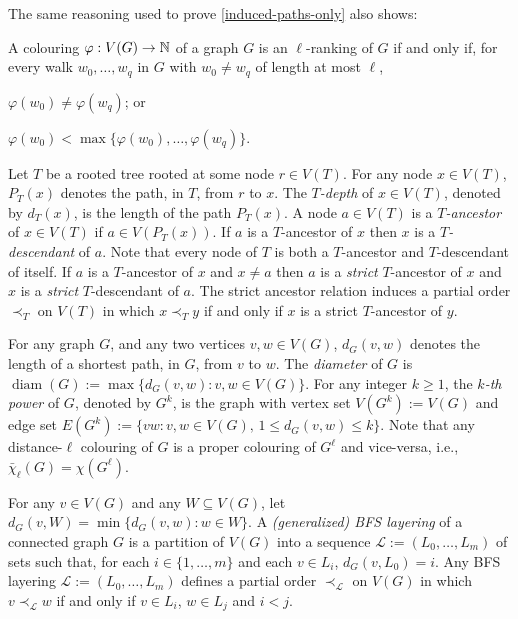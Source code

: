\documentclass[kpfonts]{patmorin}
\DeclareMathOperator{\diam}{diam}
\newcommand{\dlcn}{\bar{\chi}_\ell}
\theoremstyle{named}
\begin{document}
The same reasoning used to prove \cref{induced-paths-only} also shows:

\begin{obs}\label{walks-too}
    A colouring $\varphi:V(G)\to\mathbb{N}$ of a graph $G$ is an $\ell$-ranking of $G$ if and only if, for every walk $w_0,\ldots,w_q$ in $G$ with $w_0\neq w_q$ of length at most $\ell$,
    \begin{inparaenum}[(i)]
        \item $\varphi(w_0)\neq\varphi(w_q)$; or
        \item $\varphi(w_0)<\max\{\varphi(w_0),\ldots,\varphi(w_q)\}$.
    \end{inparaenum}
\end{obs}


Let $T$ be a rooted tree rooted at some node $r\in V(T)$.  For any node $x\in V(T)$, $P_T(x)$ denotes the path, in $T$, from $r$ to $x$.  The \emph{$T$-depth} of $x\in V(T)$, denoted by $d_T(x)$, is the length of the path $P_T(x)$.  A node $a\in V(T)$ is a \emph{$T$-ancestor} of $x\in V(T)$ if $a\in V(P_T(x))$. If $a$ is a $T$-ancestor of $x$ then $x$ is a \emph{$T$-descendant} of $a$.  Note that every node of $T$ is both a $T$-ancestor and $T$-descendant of itself.  If $a$ is a $T$-ancestor of $x$ and $x\neq a$ then $a$ is a \emph{strict} $T$-ancestor of $x$ and $x$ is a \emph{strict} $T$-descendant of $a$.  The strict ancestor relation induces a partial order $\prec_T$ on $V(T)$ in which $x\prec_T y$ if and only if $x$ is a strict $T$-ancestor of $y$.

For any graph $G$, and any two vertices $v,w\in V(G)$, $d_G(v,w)$ denotes the length of a shortest path, in $G$, from $v$ to $w$. The \emph{diameter} of $G$ is $\diam(G):=\max\{d_G(v,w):v,w\in V(G)\}$. For any integer $k\ge 1$, the \emph{$k$-th power} of $G$, denoted by $G^k$, is the graph with vertex set $V(G^k):=V(G)$ and edge set $E(G^{k}):=\{vw:v,w\in V(G),\, 1\le d_G(v,w)\le k\}$.
Note that any distance-$\ell$ colouring of $G$ is a proper colouring of $G^\ell$ and vice-versa, i.e., $\dlcn(G)=\chi(G^\ell)$.

For any $v\in V(G)$ and any $W\subseteq V(G)$, let $d_G(v,W)=\min\{d_G(v,w):w\in W\}$. A \emph{(generalized) BFS layering} of a connected graph $G$ is a partition of $V(G)$ into a sequence $\mathcal{L}:=(L_0,\ldots,L_m)$ of sets such that, for each $i\in\{1,\ldots,m\}$ and each $v\in L_i$, $d_G(v,L_0)=i$.  Any BFS layering $\mathcal{L}:=(L_0,\ldots,L_m)$ defines a partial order $\prec_{\mathcal{L}}$ on $V(G)$ in which $v\prec_{\mathcal{L}} w$ if and only if $v\in L_i$, $w\in L_j$ and $i<j$.
\end{document}
